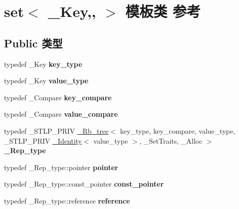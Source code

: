 \hypertarget{classset}{}\section{set$<$ \+\_\+\+Key,, $>$ 模板类 参考}
\label{classset}
\subsection*{Public 类型}
\begin{DoxyCompactItemize}
\item 
\mbox{\label{classset_a18806069795b803c921f2b726e5f6802}} 
typedef \+\_\+\+Key {\bfseries key\+\_\+type}
\item 
\mbox{\label{classset_adea299ad33dd6d0f09ba6c447dd10381}} 
typedef \+\_\+\+Key {\bfseries value\+\_\+type}
\item 
\mbox{\label{classset_aed96b2f2364a0612df3a63fd0a7e3ef0}} 
typedef \+\_\+\+Compare {\bfseries key\+\_\+compare}
\item 
\mbox{\label{classset_ad1394c77b0dbf33ace9ee1dda0a93cfb}} 
typedef \+\_\+\+Compare {\bfseries value\+\_\+compare}
\item 
\mbox{\label{classset_a829bca58fbfb810eaa56386633024b6d}} 
typedef \+\_\+\+S\+T\+L\+P\+\_\+\+P\+R\+IV \hyperlink{class___rb__tree}{\+\_\+\+Rb\+\_\+tree}$<$ key\+\_\+type, key\+\_\+compare, value\+\_\+type, \+\_\+\+S\+T\+L\+P\+\_\+\+P\+R\+IV \hyperlink{struct___identity}{\+\_\+\+Identity}$<$ value\+\_\+type $>$, \+\_\+\+Set\+Traits, \+\_\+\+Alloc $>$ {\bfseries \+\_\+\+Rep\+\_\+type}
\item 
\mbox{\label{classset_a5f74815c5587f906f659823cc3282519}} 
typedef \+\_\+\+Rep\+\_\+type\+::pointer {\bfseries pointer}
\item 
\mbox{\label{classset_aab9fb640f310110659f5ce380961b913}} 
typedef \+\_\+\+Rep\+\_\+type\+::const\+\_\+pointer {\bfseries const\+\_\+pointer}
\item 
\mbox{\label{classset_a0f62a247d1ba7c7abe1ac8ae213b2692}} 
typedef \+\_\+\+Rep\+\_\+type\+::reference {\bfseries reference}
\item 

\end{DoxyCompactItemize}
